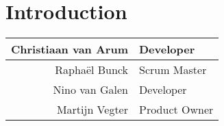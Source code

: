 \section{Introduction}

\begin{frame}{\secname}
    \begin{center}
        \begin{tabular}{r|l}
             Christiaan van Arum & Developer \\
             \hline
             Rapha\"{e}l Bunck & Scrum Master \\
             \hline
             Nino van Galen & Developer \\
             \hline
             Martijn Vegter & Product Owner
         \end{tabular}
    \end{center}
\end{frame}
